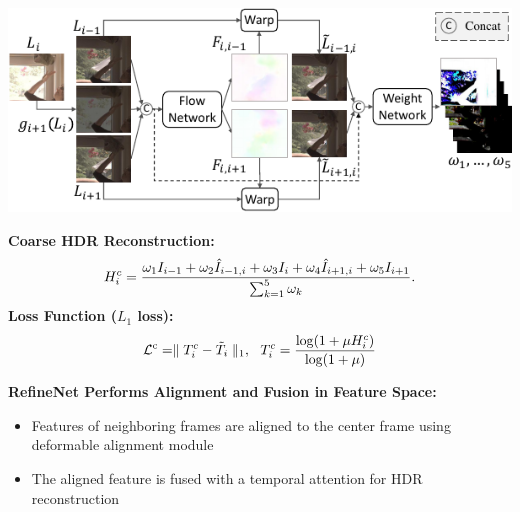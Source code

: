 \documentclass[landscape,a0paper,fontscale=0.292]{baposter}
\newcommand{\subheadercolor}{black}
\newcommand{\hdr}{H}
\newcommand{\tmhdr}{T}
\newcommand{\gttmhdr}{\tilde{\tmhdr}}
\newcommand{\lhdr}{I}
\newcommand{\warplhdr}{\hat{I}}
\newcommand{\weight}{\omega}
\newcommand{\coarsehdr}{\hdr^c}
\newcommand{\coarsetmhdr}{\tmhdr^c}
\newcommand{\coarseloss}{\mathcal{L}^\text{c}}
\begin{document}
\begin{poster}
{    \vspace{0.2em}
    \begin{minipage}[c]{0.48\linewidth}
        \begin{center}
            \includegraphics[width=\textwidth]{images/coarsenet-crop.pdf}
        \end{center}
    \end{minipage}
    \hfill
    \begin{minipage}[c]{0.48\linewidth}
        \vspace{0.2em}
        \textbf{\footnotesize Coarse HDR Reconstruction:}
        \begin{equation}
            \tiny
            \label{eq:weighted_sum}
            \coarsehdr_i = \frac{\weight_1 \lhdr_{i-1} + \weight_2 \warplhdr_{i-1,i} + \weight_3 \lhdr_i + \weight_4 \warplhdr_{i+1,i} + \weight_5 \lhdr_{i+1}}{\sum_{k=1}^5 \weight_k}.
        \end{equation}
        \textbf{\footnotesize Loss Function ($L_1$ loss):}
        \begin{equation}
            \label{eq:mutonemap}
            \tiny
            \coarseloss = \parallel \coarsetmhdr_i - \gttmhdr_i \parallel_1, \quad  \coarsetmhdr_i = \frac{\log(1+\mu \coarsehdr_i)}{\log(1+\mu)}
        \end{equation}
    \end{minipage}

    \vspace{0.5em}
    \textbf{\color{\subheadercolor}RefineNet Performs Alignment and Fusion in Feature Space:}

    \begin{itemize}
        \item {\scriptsize Features of neighboring frames are aligned to the center frame using deformable alignment module} \vspace{-0.2em}
        \item {\scriptsize The aligned feature is fused with a temporal attention for HDR reconstruction}
    \end{itemize}

}
\end{poster}
\end{document}
